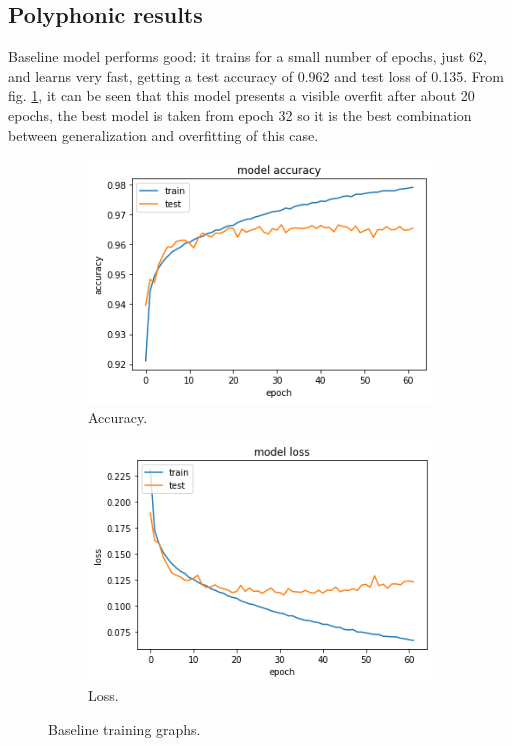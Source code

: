 \documentclass{article}
\begin{document}
\subsection{Polyphonic results}
\label{subsec:poly_results}

Baseline model performs good: it trains for a small number of epochs, just 62, and learns very fast, getting a test accuracy of 0.962 and test loss of 0.135. From fig. \ref{fig:poly_base_result}, it can be seen that this model presents a visible overfit after about 20 epochs, the best model is taken from epoch 32 so it is the best combination between generalization and overfitting of this case. 

\begin{figure}[H]
	\centering
	\begin{subfigure}{.5\textwidth}
		\centering
		\includegraphics[width=.9\linewidth]{./images/poly/baseline_acc.png}
		\caption{Accuracy.}
	\end{subfigure}%
	\begin{subfigure}{.5\textwidth}
		\centering
		\includegraphics[width=.9\linewidth]{./images/poly/baseline_loss.png}
		\caption{Loss.}
	\end{subfigure}
	\caption{Baseline training graphs.}
	\label{fig:poly_base_result}
\end{figure}
\end{document}
